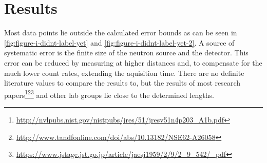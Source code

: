 \chapter{Results}\label{chap:explaining-shitty-results}%
Most data points lie outside the calculated error bounds as can be seen in \autoref{fig:figure-i-didnt-label-yet} and \autoref{fig:figure-i-didnt-label-yet-2}.
A source of systematic error is the finite size of the neutron source and the detector.
This error can be reduced by measuring at higher distances and, to compensate for the much lower count rates, extending the aquisition time.
There are no definite literature values to compare the results to, but the results of most research papers\footnote{\url{http://nvlpubs.nist.gov/nistpubs/jres/51/jresv51n4p203_A1b.pdf}}\footnote{\url{http://www.tandfonline.com/doi/abs/10.13182/NSE62-A26058}}\footnote{\url{https://www.jstage.jst.go.jp/article/jaesj1959/2/9/2_9_542/_pdf}} and other lab groups lie close to the determined lengths.
